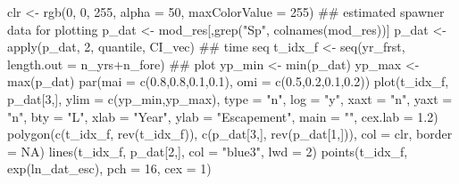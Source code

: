 \documentclass[11pt,]{article}
\newenvironment{Shaded}{}{}
\newcommand{\KeywordTok}[1]{\textcolor[rgb]{0.00,0.00,1.00}{#1}}
\newcommand{\DataTypeTok}[1]{#1}
\newcommand{\DecValTok}[1]{#1}
\newcommand{\FloatTok}[1]{#1}
\newcommand{\StringTok}[1]{\textcolor[rgb]{0.00,0.50,0.50}{#1}}
\newcommand{\OtherTok}[1]{\textcolor[rgb]{1.00,0.25,0.00}{#1}}
\newcommand{\OperatorTok}[1]{#1}
\newcommand{\NormalTok}[1]{#1}
\begin{document}
\begin{Shaded}
\begin{Highlighting}[]
\NormalTok{clr <-}\StringTok{ }\KeywordTok{rgb}\NormalTok{(}\DecValTok{0}\NormalTok{, }\DecValTok{0}\NormalTok{, }\DecValTok{255}\NormalTok{, }\DataTypeTok{alpha =} \DecValTok{50}\NormalTok{, }\DataTypeTok{maxColorValue =} \DecValTok{255}\NormalTok{)}
\NormalTok{## estimated spawner data for plotting}
\NormalTok{p_dat <-}\StringTok{ }\NormalTok{mod_res[,}\KeywordTok{grep}\NormalTok{(}\StringTok{"Sp"}\NormalTok{, }\KeywordTok{colnames}\NormalTok{(mod_res))]}
\NormalTok{p_dat <-}\StringTok{ }\KeywordTok{apply}\NormalTok{(p_dat, }\DecValTok{2}\NormalTok{, quantile, CI_vec)}
\NormalTok{## time seq}
\NormalTok{t_idx_f <-}\StringTok{ }\KeywordTok{seq}\NormalTok{(yr_frst, }\DataTypeTok{length.out =}\NormalTok{ n_yrs}\OperatorTok{+}\NormalTok{n_fore)}
\NormalTok{## plot}
\NormalTok{yp_min <-}\StringTok{ }\KeywordTok{min}\NormalTok{(p_dat)}
\NormalTok{yp_max <-}\StringTok{ }\KeywordTok{max}\NormalTok{(p_dat)}
\KeywordTok{par}\NormalTok{(}\DataTypeTok{mai =} \KeywordTok{c}\NormalTok{(}\FloatTok{0.8}\NormalTok{,}\FloatTok{0.8}\NormalTok{,}\FloatTok{0.1}\NormalTok{,}\FloatTok{0.1}\NormalTok{), }\DataTypeTok{omi =} \KeywordTok{c}\NormalTok{(}\FloatTok{0.5}\NormalTok{,}\FloatTok{0.2}\NormalTok{,}\FloatTok{0.1}\NormalTok{,}\FloatTok{0.2}\NormalTok{))}
\KeywordTok{plot}\NormalTok{(t_idx_f, p_dat[}\DecValTok{3}\NormalTok{,], }\DataTypeTok{ylim =} \KeywordTok{c}\NormalTok{(yp_min,yp_max), }\DataTypeTok{type =} \StringTok{"n"}\NormalTok{,}
     \DataTypeTok{log =} \StringTok{"y"}\NormalTok{, }\DataTypeTok{xaxt =} \StringTok{"n"}\NormalTok{, }\DataTypeTok{yaxt =} \StringTok{"n"}\NormalTok{, }\DataTypeTok{bty =} \StringTok{"L"}\NormalTok{,}
     \DataTypeTok{xlab =} \StringTok{"Year"}\NormalTok{, }\DataTypeTok{ylab =} \StringTok{"Escapement"}\NormalTok{, }\DataTypeTok{main =} \StringTok{""}\NormalTok{, }\DataTypeTok{cex.lab =} \FloatTok{1.2}\NormalTok{)}
\KeywordTok{polygon}\NormalTok{(}\KeywordTok{c}\NormalTok{(t_idx_f, }\KeywordTok{rev}\NormalTok{(t_idx_f)), }\KeywordTok{c}\NormalTok{(p_dat[}\DecValTok{3}\NormalTok{,], }\KeywordTok{rev}\NormalTok{(p_dat[}\DecValTok{1}\NormalTok{,])),}
        \DataTypeTok{col =}\NormalTok{ clr, }\DataTypeTok{border =} \OtherTok{NA}\NormalTok{)}
\KeywordTok{lines}\NormalTok{(t_idx_f, p_dat[}\DecValTok{2}\NormalTok{,], }\DataTypeTok{col =} \StringTok{"blue3"}\NormalTok{, }\DataTypeTok{lwd =} \DecValTok{2}\NormalTok{)}
\KeywordTok{points}\NormalTok{(t_idx_f, }\KeywordTok{exp}\NormalTok{(ln_dat_esc), }\DataTypeTok{pch =} \DecValTok{16}\NormalTok{, }\DataTypeTok{cex =} \DecValTok{1}\NormalTok{)}

\end{Highlighting}
\end{Shaded}
\end{document}
